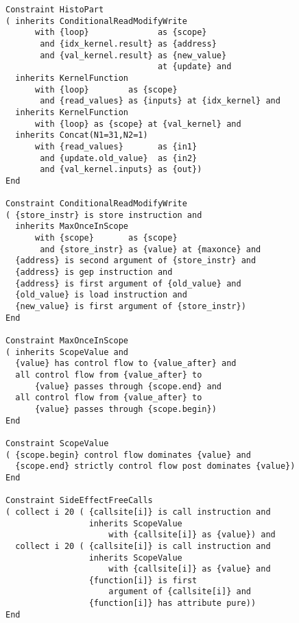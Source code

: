 \begin{figure}[p]
\begin{lstlisting}[language=IDL,basicstyle=\linespread{0.8}\ttfamily,
                   firstnumber=85]
Constraint HistoPart
( inherits ConditionalReadModifyWrite
      with {loop}              as {scope}
       and {idx_kernel.result} as {address}
       and {val_kernel.result} as {new_value}
                               at {update} and
  inherits KernelFunction
      with {loop}        as {scope}
       and {read_values} as {inputs} at {idx_kernel} and
  inherits KernelFunction
      with {loop} as {scope} at {val_kernel} and
  inherits Concat(N1=31,N2=1)
      with {read_values}       as {in1}
       and {update.old_value}  as {in2}
       and {val_kernel.inputs} as {out})
End

Constraint ConditionalReadModifyWrite
( {store_instr} is store instruction and
  inherits MaxOnceInScope
      with {scope}       as {scope}
       and {store_instr} as {value} at {maxonce} and
  {address} is second argument of {store_instr} and
  {address} is gep instruction and
  {address} is first argument of {old_value} and
  {old_value} is load instruction and
  {new_value} is first argument of {store_instr})
End

Constraint MaxOnceInScope
( inherits ScopeValue and
  {value} has control flow to {value_after} and
  all control flow from {value_after} to
      {value} passes through {scope.end} and
  all control flow from {value_after} to
      {value} passes through {scope.begin})
End

Constraint ScopeValue
( {scope.begin} control flow dominates {value} and
  {scope.end} strictly control flow post dominates {value})
End

Constraint SideEffectFreeCalls
( collect i 20 ( {callsite[i]} is call instruction and
                 inherits ScopeValue
                     with {callsite[i]} as {value}) and
  collect i 20 ( {callsite[i]} is call instruction and
                 inherits ScopeValue
                     with {callsite[i]} as {value} and
                 {function[i]} is first
                     argument of {callsite[i]} and
                 {function[i]} has attribute pure))
End
\end{lstlisting}
\end{figure}
